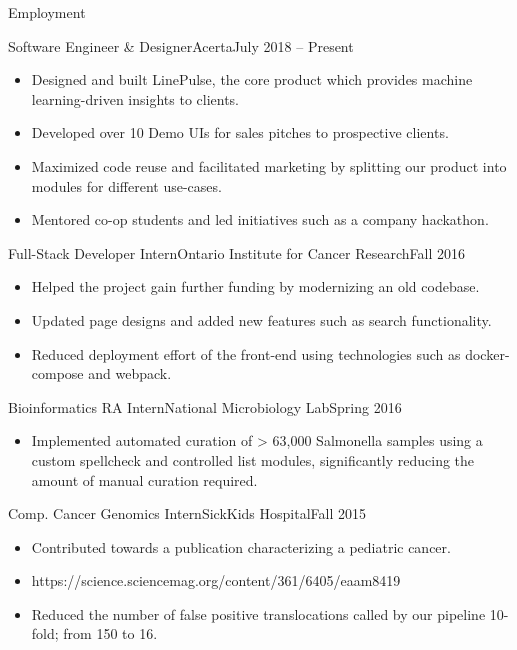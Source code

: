 \documentclass[]{mcdowellcv}
\begin{document}
	\makeheader
	
	\begin{cvsection}{Employment}
		\begin{cvsubsection}{Software Engineer \& Designer}{Acerta}{July 2018 -- Present}
			\begin{itemize}
				\item Designed and built LinePulse, the core product which provides machine learning-driven insights to clients.
				\item Developed over 10 Demo UIs for sales pitches to prospective clients.
				\item Maximized code reuse and facilitated marketing by splitting our product into modules for different use-cases.
				\item Mentored co-op students and led initiatives such as a company hackathon.
			\end{itemize}
		\end{cvsubsection}
		
		\begin{cvsubsection}{Full-Stack Developer Intern}{Ontario Institute for Cancer Research}{Fall 2016}	
			\begin{itemize}
				\item Helped the project gain further funding by modernizing an old codebase.
				\item Updated page designs and added new features such as search functionality.
				\item Reduced deployment effort of the front-end using technologies such as docker-compose and webpack.
			\end{itemize}
		\end{cvsubsection}
		
		\begin{cvsubsection}{Bioinformatics RA Intern}{National Microbiology Lab}{Spring 2016}		
			\begin{itemize}
				\item Implemented automated curation of > 63,000 Salmonella samples using a custom spellcheck and controlled list modules, significantly reducing the amount of manual curation required.
			\end{itemize}
		\end{cvsubsection}
		
		\begin{cvsubsection}{Comp. Cancer Genomics Intern}{SickKids Hospital}{Fall 2015}
			\begin{itemize}
				\item Contributed towards a publication characterizing a pediatric cancer.
				\item https://science.sciencemag.org/content/361/6405/eaam8419	
				\item Reduced the number of false positive translocations called by our pipeline 10-fold; from 150 to 16.
			\end{itemize}
		\end{cvsubsection}
	\end{cvsection}
	
\end{document}
